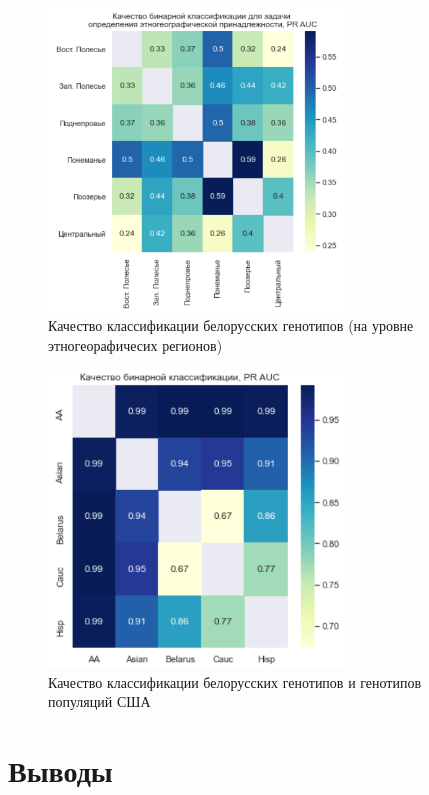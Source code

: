 \begin{figure}[h]
\begin{center}
\includegraphics[width=8cm]{images/bel_reg_pr_auc.png}
\end{center}
  \caption{Качество классификации белорусских генотипов (на уровне этногеорафичесих регионов)}
  \label{image:bel_pr}
\end{figure}

\begin{figure}[h]
\begin{center}
\includegraphics[width=8cm]{images/bel_us_pr.png}
\end{center}
  \caption{Качество классификации белорусских генотипов и генотипов популяций США}
  \label{image:bel_us_pr}
\end{figure}

\section{Выводы}


